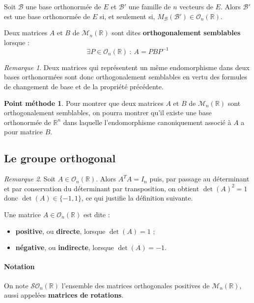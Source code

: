 \documentclass[french]{article}
\newcommand{\R}{\mathbb{R}}
\newcommand{\inv}{^{-1}}
\theoremstyle{plain}
\theoremstyle{definition}
\newtheorem*{met}{Point méthode}
\theoremstyle{remark}
\newtheorem*{rmq}{Remarque}
\begin{document}
\begin{thm}{}
	Soit $\mathcal{B}$ une base orthonormée de $E$ et $\mathcal{B}'$ une famille de $n$ vecteurs de $E$. Alors $\mathcal{B}'$ est une base orthonormée de $E$ si, et seulement si, $M_\mathcal{B}(\mathcal{B}')\in\mathcal{O}_n(\R)$.
\end{thm}

\begin{dfn}
	Deux matrices $A$ et $B$ de $\mathcal{M}_n(\R)$ sont dites \textbf{orthogonalement semblables} lorsque : $$\exists P\in\mathcal{O}_n(\R)\ : \ A=PBP\inv$$
\end{dfn}

\begin{rmq}
	Deux matrices qui représentent un même endomorphisme dans deux bases orthonormées sont donc orthogonalement semblables en vertu des formules de changement de base et de la propriété précédente.
\end{rmq}

\begin{met}
	Pour montrer que deux matrices $A$ et $B$ de $\mathcal{M}_n(\R)$ sont orthogonalement semblables, on pourra montrer qu'il existe une base orthonormée de $\R^n$ dans laquelle l'endomorphisme canoniquement associé à $A$ a pour matrice $B$.
\end{met}

\subsection{Le groupe orthogonal}

\begin{rmq}
	Soit $A\in\mathcal{O}_n(\R)$. Alors $A^TA=I_n$ puis, par passage au déterminant et par conservation du déterminant par transposition, on obtient $\det(A)^2=1$ donc $\det(A)\in\{-1,1\}$, ce qui justifie la définition suivante.
\end{rmq}

\begin{dfn}
	Une matrice $A\in\mathcal{O}_n(\R)$ est dite :
	\begin{itemize}
		\item \textbf{positive}, ou \textbf{directe}, lorsque $\det(A)=1$ ;
		\item \textbf{négative}, ou \textbf{indirecte}, lorsque $\det(A)=-1$.
	\end{itemize}
\end{dfn}

\paragraph{Notation} On note $\mathcal{SO}_n(\R)$ l'ensemble des matrices orthogonales positives de $\mathcal{M}_n(\R)$, aussi appelées \textbf{matrices de rotations}.
\end{document}
